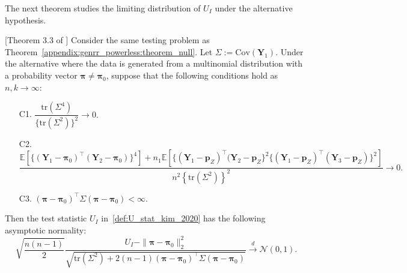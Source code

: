 \documentclass[twoside,11pt]{article}
\newcommand{\rvTwo}{Y}
\newcommand{\rvThree}{Z}
\newcommand{\vectorize}[1]{\mathbf{#1}}
\newcommand{\alphabetSize}{k} %
\newcommand{\sampleSize}{n}
\newcommand{\probVec}{\mathbf{p}} %
\begin{document}
\begin{appendix}
	
	The next theorem studies the limiting distribution of $U_I$ under the alternative hypothesis. 
	\begin{theorem}\label{appendix:genrr_powerless:theorem:alternative_dist}[Theorem 3.3 of \citet{kim_multinomial_2020}%
		]
		Consider the same testing problem as Theorem~\ref{appendix:genrr_powerless:theorem_null}.
		Let $\Sigma := \mathrm{Cov}(\vectorize{Y}_1)$. Under the alternative
		where the data is generated from a multinomial distribution with a probability vector $\boldsymbol{\pi} \neq \boldsymbol{\pi}_0$,
		suppose that the following conditions hold as $\sampleSize, \alphabetSize \to \infty$:
		\begin{enumerate}
			\item[C1.] 
			$
			\dfrac{
				\mathrm{tr}(\Sigma^4)
			}{
				\bigl\{
				\mathrm{tr}(\Sigma^2)
				\bigr\}^2   
			}
			\to
			0.
			$
			\item[C2.]
			$
			\dfrac{
				\mathbb{E}[\bigl\{ (\vectorize{\rvTwo}_1 - \boldsymbol{\pi}_0)^\top (\vectorize{\rvTwo}_2
				-
				\boldsymbol{\pi}_0)
				\bigr\}^4]
				+
				\sampleSize_1
				\mathbb{E}
				[\bigl\{ (\vectorize{\rvTwo}_1 - \probVec_{\rvThree})^\top (\vectorize{\rvTwo}_2
				-
				\probVec_{\rvThree}
				\bigr\}^2
				\bigl\{ (\vectorize{\rvTwo}_1 - \probVec_{\rvThree})^\top (\vectorize{\rvTwo}_3
				-
				\probVec_{\rvThree})
				\bigr\}^2]
			}{
				\sampleSize^2
				\left\{
				\mathrm{tr}(\Sigma^2)
				\right\}^2
			} \to 0.
			$
			\item[C3.]
			$(\boldsymbol{\pi} - \boldsymbol{\pi}_0)^\top  \Sigma  (\boldsymbol{\pi} - \boldsymbol{\pi}_0) < \infty$.
		\end{enumerate}
		Then the test statistic $U_I$ in~\eqref{def:U_stat_kim_2020} has the following asymptotic normality:
		\begin{equation}\label{one_sample_asymptotic_normal_theorem}
			\sqrt{
				\frac{
					\sampleSize(\sampleSize-1)
				}{
					2
				} 
			}
			\frac{
				U_{I}
				-
				\| \boldsymbol{\pi}  - \boldsymbol{\pi}_0\|_2^2}{
				\sqrt{
					\mathrm{tr}(\Sigma^2)
					+
					2(\sampleSize - 1)
					(\boldsymbol{\pi} - \boldsymbol{\pi}_0)^\top 
					\Sigma
					(\boldsymbol{\pi} - \boldsymbol{\pi}_0)	
				}
			}
			\stackrel{d}{\to}
			\mathcal{N}(0,1).
		\end{equation}
	\end{theorem}
	

\end{appendix}
\end{document}
